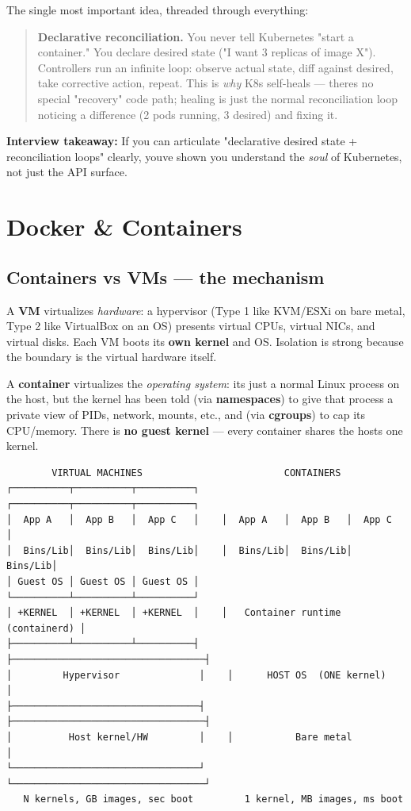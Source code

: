 \documentclass[11pt]{article}
\begin{document}
The single most important idea, threaded through everything:

\begin{quote}
\textbf{Declarative reconciliation.} You never tell Kubernetes "start a container." You declare desired state ("I want 3 replicas of image X"). Controllers run an infinite loop: observe actual state, diff against desired, take corrective action, repeat. This is \emph{why} K8s self-heals --- there\textquotesingle s no special "recovery" code path; healing is just the normal reconciliation loop noticing a difference (2 pods running, 3 desired) and fixing it.
\end{quote}

\textbf{Interview takeaway:} If you can articulate "declarative desired state + reconciliation loops" clearly, you\textquotesingle ve shown you understand the \emph{soul} of Kubernetes, not just the API surface.

\section{Docker \& Containers}\label{docker--containers}

\subsection{Containers vs VMs --- the mechanism}\label{containers-vs-vms--the-mechanism}

A \textbf{VM} virtualizes \emph{hardware}: a hypervisor (Type 1 like KVM/ESXi on bare metal, Type 2 like VirtualBox on an OS) presents virtual CPUs, virtual NICs, and virtual disks. Each VM boots its \textbf{own kernel} and OS. Isolation is strong because the boundary is the virtual hardware itself.

A \textbf{container} virtualizes the \emph{operating system}: it\textquotesingle s just a normal Linux process on the host, but the kernel has been told (via \textbf{namespaces}) to give that process a private view of PIDs, network, mounts, etc., and (via \textbf{cgroups}) to cap its CPU/memory. There is \textbf{no guest kernel} --- every container shares the host\textquotesingle s one kernel.

\setcodelang{}

\begin{verbatim}
        VIRTUAL MACHINES                         CONTAINERS
┌──────────┬──────────┬──────────┐    ┌──────────┬──────────┬──────────┐
│  App A   │  App B   │  App C   │    │  App A   │  App B   │  App C   │
│  Bins/Lib│  Bins/Lib│  Bins/Lib│    │  Bins/Lib│  Bins/Lib│  Bins/Lib│
│ Guest OS │ Guest OS │ Guest OS │    └──────────┴──────────┴──────────┘
│ +KERNEL  │ +KERNEL  │ +KERNEL  │    │   Container runtime (containerd) │
├──────────┴──────────┴──────────┤    ├──────────────────────────────────┤
│         Hypervisor              │    │      HOST OS  (ONE kernel)       │
├─────────────────────────────────┤    ├──────────────────────────────────┤
│          Host kernel/HW         │    │           Bare metal             │
└─────────────────────────────────┘    └──────────────────────────────────┘
   N kernels, GB images, sec boot         1 kernel, MB images, ms boot
\end{verbatim}
\end{document}
